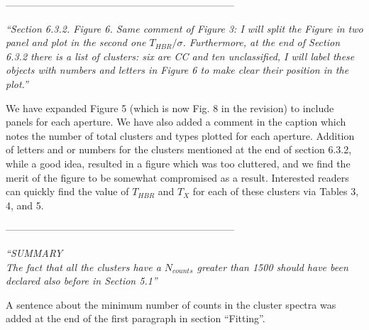 \documentclass[11pt]{article}
\begin{document}
---------------------------------------------------------------------

\textit{
``Section 6.3.2. Figure 6. Same comment of Figure 3: I will split the
Figure in two panel and plot in the second one $T_{HBR}/\sigma$.
Furthermore, at the end of Section 6.3.2 there is a list of clusters:
six are CC and ten unclassified, I will label these objects with
numbers and letters in Figure 6 to make clear their position in
the plot.''
}

We have expanded Figure 5 (which is now Fig. 8 in the revision) to
include panels for each aperture. We have also added a comment in the
caption which notes the number of total clusters and types plotted for
each aperture. Addition of letters and or numbers for the clusters
mentioned at the end of section 6.3.2, while a good idea, resulted in
a figure which was too cluttered, and we find the merit of the figure to
be somewhat compromised as a result. Interested readers can quickly
find the value of $T_{HBR}$ and $T_X$ for each of these clusters via
Tables 3, 4, and 5.

---------------------------------------------------------------------

\textit{
``{SUMMARY}\\
The fact that all the clusters have a $N_{counts}$ greater than 1500
should have been declared also before in Section 5.1''
}

A sentence about the minimum number of counts in the cluster spectra
was added at the end of the first paragraph in section ``Fitting''.
\end{document}
